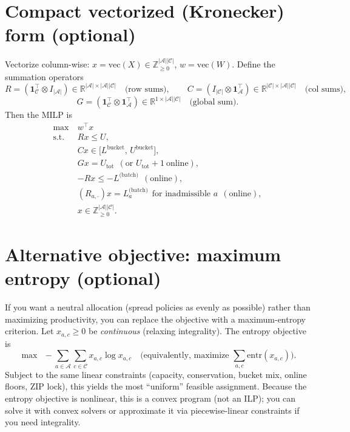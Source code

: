 \documentclass[11pt]{article}
\newcommand{\A}{\mathcal{A}}                 %
\newcommand{\C}{\mathcal{C}}                 %
\newcommand{\Z}{\mathbb{Z}}
\newcommand{\R}{\mathbb{R}}
\newcommand{\onesA}{\mathbf{1}_{\A}}         %
\newcommand{\onesC}{\mathbf{1}_{\C}}         %
\newcommand{\vecop}{\mathrm{vec}}            %
\begin{document}
\section{Compact vectorized (Kronecker) form (optional)}

Vectorize column-wise: $x=\vecop(X)\in\Z_{\ge 0}^{|\A||\C|}$, $w=\vecop(W)$.
Define the summation operators
\[
R=(\onesC^\top\!\otimes I_{|\A|})\in \R^{|\A|\times |\A||\C|}\quad\text{(row sums)},\qquad
C=(I_{|\C|}\!\otimes \onesA^\top)\in \R^{|\C|\times |\A||\C|}\quad\text{(col sums)},
\]
\[
G=(\onesC^\top\!\otimes \onesA^\top)\in \R^{1\times |\A||\C|}\quad\text{(global sum)}.
\]
Then the MILP is
\begin{equation*}
\begin{aligned}
\max\ & w^\top x \\
\text{s.t. }\
& R x \le U,\\
& C x \in \big[L^{\text{bucket}},\, U^{\text{bucket}}\big],\\
& G x = U_{\mathrm{tot}} \ \ (\text{or }U_{\mathrm{tot}}+1\ \text{online}),\\
& -R x \le -L^{\text{(batch)}}\ \ (\text{online}),\\
& (R_{a,\cdot})x=L^{\text{(batch)}}_a\ \ \text{for inadmissible }a\ \ (\text{online}),\\
& x\in \Z_{\ge 0}^{|\A||\C|}.
\end{aligned}
\end{equation*}


\section{Alternative objective: maximum entropy (optional)}
If you want a neutral allocation (spread policies as evenly as possible) rather than
maximizing productivity, you can replace the objective with a maximum-entropy criterion.
Let $x_{a,c}\ge 0$ be \emph{continuous} (relaxing integrality). The entropy objective is
\[
\max\ \ -\sum_{a\in\A}\sum_{c\in\C} x_{a,c}\log x_{a,c}
\quad\text{(equivalently, maximize } \sum_{a,c}\mathrm{entr}(x_{a,c})\text{)}.
\]
Subject to the same linear constraints (capacity, conservation, bucket mix, online floors,
ZIP lock), this yields the most ``uniform'' feasible assignment. Because the entropy
objective is nonlinear, this is a convex program (not an ILP); you can solve it with
convex solvers or approximate it via piecewise-linear constraints if you need integrality.
\end{document}
